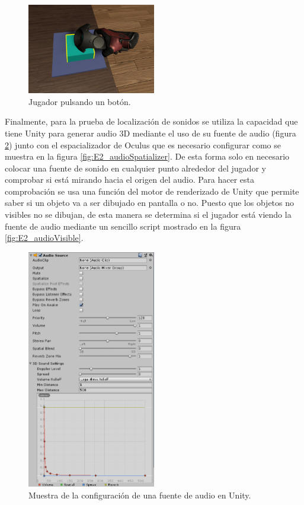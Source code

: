 \begin{figure}
  \centering
    \includegraphics[width=0.5\textwidth]{04.Desarrollo/02.Entrega2/02.Iteracion2_2/00.Figuras/08.boton.png}
    \caption{Jugador pulsando un botón.}
    \label{fig:E2_boton}
\end{figure}

Finalmente, para la prueba de localización de sonidos se utiliza la capacidad que tiene Unity para generar audio 3D mediante el uso de su fuente de audio (figura \ref{fig:E2_audioSource}) junto con el espacializador de Oculus que es necesario configurar como se muestra en la figura \ref{fig:E2_audioSpatializer}. De esta forma solo en necesario colocar una fuente de sonido en cualquier punto alrededor del jugador y comprobar si está mirando hacia el origen del audio. Para hacer esta comprobación se usa una función del motor de renderizado de Unity que permite saber si un objeto va a ser dibujado en pantalla o no. Puesto que los objetos no visibles no se dibujan, de esta manera se determina si el jugador está viendo la fuente de audio mediante un sencillo script mostrado en la figura \ref{fig:E2_audioVisible}.

\begin{figure}
  \centering
    \includegraphics[width=0.5\textwidth]{04.Desarrollo/02.Entrega2/02.Iteracion2_2/00.Figuras/09.audio_source.png}
    \caption{Muestra de la configuración de una fuente de audio en Unity.}
    \label{fig:E2_audioSource}
\end{figure}


